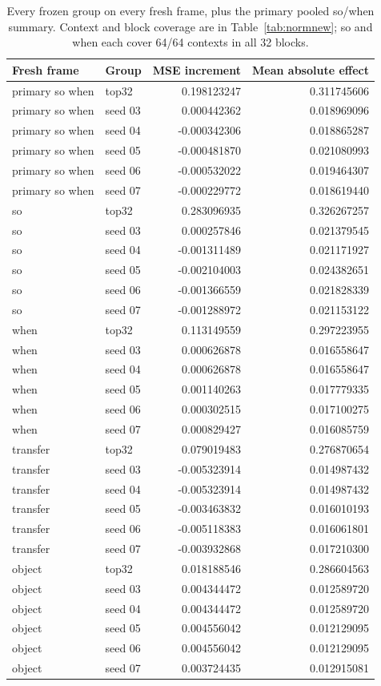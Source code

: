 \begin{table}[!ht]\centering\footnotesize
\begin{tabular}{llrr}\toprule
Fresh frame & Group & MSE increment & Mean absolute effect\\\midrule
primary so when & top32 & 0.198123247 & 0.311745606\\
primary so when & seed 03 & 0.000442362 & 0.018969096\\
primary so when & seed 04 & -0.000342306 & 0.018865287\\
primary so when & seed 05 & -0.000481870 & 0.021080993\\
primary so when & seed 06 & -0.000532022 & 0.019464307\\
primary so when & seed 07 & -0.000229772 & 0.018619440\\
so & top32 & 0.283096935 & 0.326267257\\
so & seed 03 & 0.000257846 & 0.021379545\\
so & seed 04 & -0.001311489 & 0.021171927\\
so & seed 05 & -0.002104003 & 0.024382651\\
so & seed 06 & -0.001366559 & 0.021828339\\
so & seed 07 & -0.001288972 & 0.021153122\\
when & top32 & 0.113149559 & 0.297223955\\
when & seed 03 & 0.000626878 & 0.016558647\\
when & seed 04 & 0.000626878 & 0.016558647\\
when & seed 05 & 0.001140263 & 0.017779335\\
when & seed 06 & 0.000302515 & 0.017100275\\
when & seed 07 & 0.000829427 & 0.016085759\\
transfer & top32 & 0.079019483 & 0.276870654\\
transfer & seed 03 & -0.005323914 & 0.014987432\\
transfer & seed 04 & -0.005323914 & 0.014987432\\
transfer & seed 05 & -0.003463832 & 0.016010193\\
transfer & seed 06 & -0.005118383 & 0.016061801\\
transfer & seed 07 & -0.003932868 & 0.017210300\\
object & top32 & 0.018188546 & 0.286604563\\
object & seed 03 & 0.004344472 & 0.012589720\\
object & seed 04 & 0.004344472 & 0.012589720\\
object & seed 05 & 0.004556042 & 0.012129095\\
object & seed 06 & 0.004556042 & 0.012129095\\
object & seed 07 & 0.003724435 & 0.012915081\\
\bottomrule\end{tabular}
\caption{Every frozen group on every fresh frame, plus the primary pooled so/when summary. Context and block coverage are in Table~\ref{tab:normnew}; so and when each cover 64/64 contexts in all 32 blocks.}\end{table}
